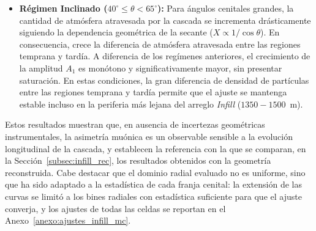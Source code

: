 \begin{itemize}
	\item \textbf{Régimen Inclinado ($40^\circ \leq \theta < 65^\circ$):} Para ángulos cenitales grandes, la cantidad de atmósfera atravesada por la cascada se incrementa drásticamente siguiendo la dependencia geométrica de la secante ($X \propto 1/\cos\theta$). %
{\color{blue}En consecuencia, crece la diferencia de atmósfera atravesada entre las regiones temprana y tardía.} A diferencia de los regímenes anteriores, el crecimiento de la amplitud $A_1$ es monótono y significativamente mayor, sin presentar saturación. {\color{blue}En estas condiciones, la gran diferencia de densidad de partículas entre las regiones temprana y tardía permite que el ajuste se mantenga estable incluso en la periferia más lejana del arreglo \textit{Infill} ($1350 - 1500$~m).}
\end{itemize}

{\color{blue}Estos resultados muestran que, en ausencia de incertezas geométricas instrumentales, la asimetría muónica es un observable sensible a la evolución longitudinal de la cascada, y establecen la referencia con la que se comparan, en la Sección~\ref{subsec:infill_rec}, los resultados obtenidos con la geometría reconstruida. Cabe destacar que el dominio radial evaluado no es uniforme, sino que ha sido adaptado a la estadística de cada franja cenital: la extensión de las curvas se limitó a los bines radiales con estadística suficiente para que el ajuste converja, y los ajustes de todas las celdas se reportan en el Anexo~\ref{anexo:ajustes_infill_mc}.}


